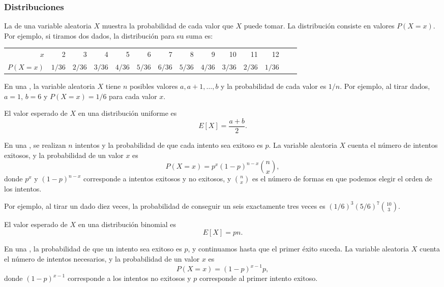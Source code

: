 \subsubsection{Distribuciones}


La  de una variable aleatoria $X$ muestra la probabilidad
de cada valor que $X$ puede tomar. La distribución consiste en valores
$P(X=x)$. Por ejemplo, si tiramos dos dados, la distribución para su suma es:
\begin{center}
    \small {
        \begin{tabular}{r|rrrrrrrrrrrrr}
            $x$      & 2      & 3      & 4      & 5      & 6      & 7      & 8      & 9      & 10     & 11     & 12     \\
            $P(X=x)$ & $1/36$ & $2/36$ & $3/36$ & $4/36$ & $5/36$ & $6/36$ & $5/36$ & $4/36$ & $3/36$ & $2/36$ & $1/36$ \\
        \end{tabular}
    }
\end{center}

En una , la variable aleatoria $X$ tiene $n$
posibles valores $a,a+1,\ldots,b$ y la probabilidad de cada valor es
$1/n$. Por ejemplo, al tirar dados, $a=1$, $b=6$ y $P(X=x)=1/6$ para cada
valor $x$.

El valor esperado de $X$ en una distribución uniforme es
\[E[X] = \frac{a+b}{2}.\]

En una , se realizan $n$ intentos y la
probabilidad de que cada intento sea exitoso es $p$. La variable aleatoria
$X$ cuenta el número de intentos exitosos, y la probabilidad de un valor
$x$ es \[P(X=x)=p^x (1-p)^{n-x} \binom{n}{x},\] donde $p^x$ y
$(1-p)^{n-x}$ corresponde a intentos exitosos y no exitosos, y
$\binom{n}{x}$ es el número de formas en que podemos elegir el orden
de los intentos.

Por ejemplo, al tirar un dado diez veces, la probabilidad de conseguir
un seis exactamente tres veces es $(1/6)^3 (5/6)^7 \binom{10}{3}$.

El valor esperado de $X$ en una distribución binomial es \[E[X] = pn.\]

En una , la probabilidad de que un intento
sea exitoso es $p$, y continuamos hasta que el primer éxito suceda. La
variable aleatoria $X$ cuenta el número de intentos necesarios, y la
probabilidad de un valor $x$ es \[P(X=x)=(1-p)^{x-1} p,\] donde
$(1-p)^{x-1}$ corresponde a los intentos no exitosos y $p$ corresponde
al primer intento exitoso.

